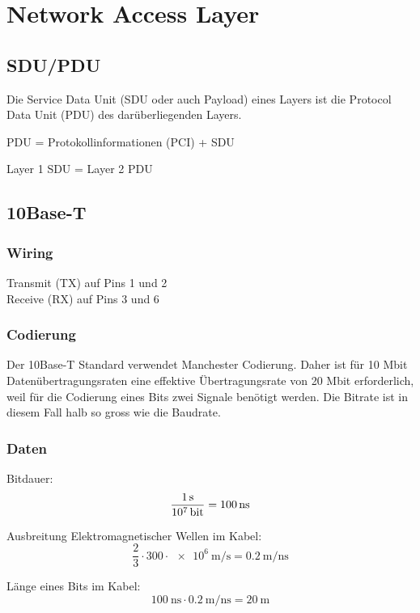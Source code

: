 \section{Network Access Layer}


\subsection{SDU/PDU}

Die Service Data Unit (SDU oder auch Payload) eines Layers ist die Protocol Data
Unit (PDU) des darüberliegenden Layers.

PDU = Protokollinformationen (PCI) + SDU

Layer 1 SDU = Layer 2 PDU


\subsection{10Base-T}

\subsubsection{Wiring}

Transmit (TX) auf Pins 1 und 2\\
Receive (RX) auf Pins 3 und 6

\subsubsection{Codierung}

Der 10Base-T Standard verwendet Manchester Codierung. Daher ist für 10 Mbit
Datenübertragungsraten eine effektive Übertragungsrate von 20 Mbit erforderlich,
weil für die Codierung eines Bits zwei Signale benötigt werden. Die Bitrate ist
in diesem Fall halb so gross wie die Baudrate.

\subsubsection{Daten}

Bitdauer:
\[
	\frac{\SI{1}{\second}}{\SI{e7}{\bit}} = \SI{100}{\ns}
\]

Ausbreitung Elektromagnetischer Wellen im Kabel: 
\[
	\frac{2}{3} \cdot 300\cdot \SI{e6}{\meter\per\second} = \SI{0.2}{\meter\per\ns}
\]

Länge eines Bits im Kabel:
\[
	\SI{100}{\ns} \cdot \SI{0.2}{\meter\per\ns} = \SI{20}{\meter}
\]


